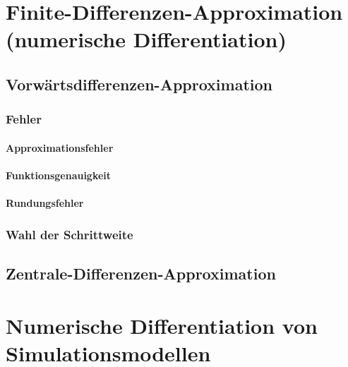     \section{Finite-Differenzen-Approximation (numerische Differentiation)} %

        \subsection{Vorwärtsdifferenzen-Approximation} %

            \subsubsection{Fehler} %

                \paragraph{Approximationsfehler} %

                \paragraph{Funktionsgenauigkeit} %

                \paragraph{Rundungsfehler} %

            \subsubsection{Wahl der Schrittweite} %

        \subsection{Zentrale-Differenzen-Approximation} %

    \section{Numerische Differentiation von Simulationsmodellen} %


